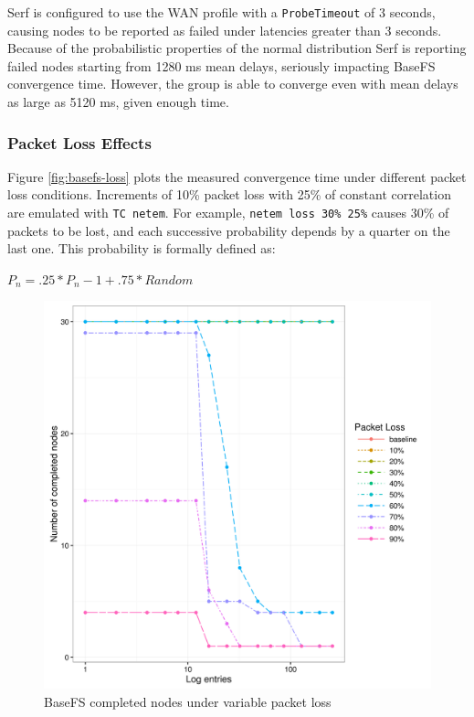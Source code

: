 \documentclass{sig-alternate}
\begin{document}
Serf is configured to use the WAN profile with a \texttt{ProbeTimeout} of 3 seconds, causing nodes to be reported as failed under latencies greater than 3 seconds. Because of the probabilistic properties of the normal distribution Serf is reporting failed nodes starting from 1280 ms mean delays, seriously impacting BaseFS convergence time. However, the group is able to converge even with mean delays as large as 5120 ms, given enough time.


\subsubsection{Packet Loss Effects}

Figure \ref{fig:basefs-loss} plots the measured convergence time under different packet loss conditions. Increments of 10\% packet loss with 25\% of constant correlation are emulated with \texttt{TC netem}. For example, \texttt{netem loss 30\% 25\%} causes 30\% of packets to be lost, and each successive probability depends by a quarter on the last one. This probability is formally defined as:

$P_n = .25 * P_n-1 + .75 * Random$



\begin{figure}
\centering
\includegraphics[width=\columnwidth]{imgs/basefs-loss-completed.png}
\caption{BaseFS completed nodes under variable packet loss}
\label{fig:basefs-loss-completed}
\end{figure}
\end{document}
